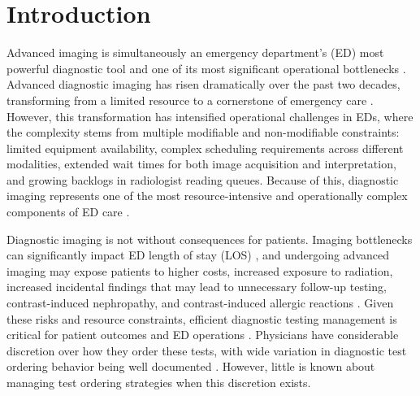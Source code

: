\documentclass[,,nonblindrev]{informs}
\begin{document}

\maketitle


\section{Introduction}\label{sec:1}

Advanced imaging is simultaneously an emergency department's (ED) most
powerful diagnostic tool and one of its most significant operational
bottlenecks \citep{Rogg2017}. Advanced diagnostic imaging has risen
dramatically over the past two decades, transforming from a limited
resource to a cornerstone of emergency care
\citep[\citet{smith-bindman2019trends}]{Juliusson2019}. However, this
transformation has intensified operational challenges in EDs, where the
complexity stems from multiple modifiable and non-modifiable
constraints: limited equipment availability, complex scheduling
requirements across different modalities, extended wait times for both
image acquisition and interpretation, and growing backlogs in
radiologist reading queues. Because of this, diagnostic imaging
represents one of the most resource-intensive and operationally complex
components of ED care \citep[\citet{baloescu2018diagnostic},
\citet{poyiadji2023diagnostic}]{mills2015optimizing}.

Diagnostic imaging is not without consequences for patients. Imaging
bottlenecks can significantly impact ED length of stay (LOS)
\citep{Cournane2016}, and undergoing advanced imaging may expose
patients to higher costs, increased exposure to radiation, increased
incidental findings that may lead to unnecessary follow-up testing,
contrast-induced nephropathy, and contrast-induced allergic reactions
\citep[\citet{Raja2014}]{valtchinov2019use}. Given these risks and
resource constraints, efficient diagnostic testing management is
critical for patient outcomes and ED operations \citep{naseim2015}.
Physicians have considerable discretion over how they order these tests,
with wide variation in diagnostic test ordering behavior being well
documented \citep[\citet{Solomon1998}, \citet{Wennberg1984},
\citet{Daniels1977}]{Miller1994}. However, little is known about
managing test ordering strategies when this discretion exists.
\end{document}
